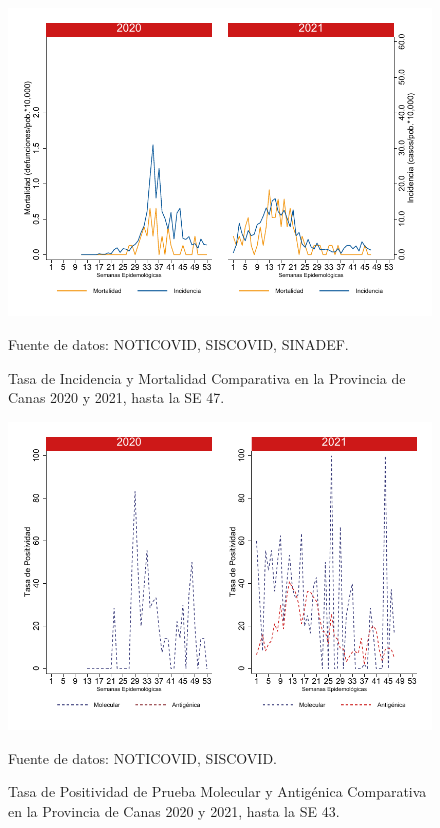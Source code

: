 \documentclass[12pt,a4paper,openany]{book}
\begin{document}
		\begin{figure}[h]
			\caption{Tasa de Incidencia y Mortalidad Comparativa en la Provincia de Canas 2020 y 2021, hasta la SE 47.}\label{fig:inc_mort_canas}
			\begin{center}
				\includegraphics[width=0.7\linewidth]{../figuras/incidencia_mortalidad_20_21_3}
			\end{center}
			{\footnotesize {Fuente de datos: NOTICOVID, SISCOVID, SINADEF.}}
		\end{figure}
		
		\begin{figure}[h]
			\caption{Tasa de Positividad de Prueba Molecular y Antigénica Comparativa en la Provincia de Canas 2020 y 2021, hasta la SE 43.}\label{fig:positividad_canas}
			\begin{center}
				\includegraphics[width=0.7\linewidth]{../figuras/positividad_20_21_3}
			\end{center}
			{\footnotesize {Fuente de datos: NOTICOVID, SISCOVID.}}
		\end{figure}
		
\end{document}
